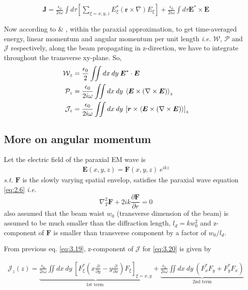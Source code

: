 \documentclass[11pt,a4paper]{article}
\numberwithin{equation}{section}
\begin{document}
\begin{align}
	 \boldsymbol{J}=\frac{\epsilon_0}{2i\omega}\int d\tau \left[\sum_{\xi=x,y,z}E_\xi^\ast(\boldsymbol{r}\times\nabla)E_\xi\right]+ \frac{\epsilon_0}{2i\omega}\int d\tau \boldsymbol{E}^\ast\times \boldsymbol{E}
\end{align}

Now according to \cite{bernatt allen 94} \& \cite{enk nien 92}, within the paraxial approximation, to get time-averaged energy, linear momentum and angular momentum per unit length \textit{i.e.} $\mathcal{W}$, $\mathcal{P}$ and $\mathcal{J}$ respectively, along the beam propagating in z-direction, we have to integrate throughout the transverse xy-plane. So,
\begin{align}
	\mathcal{W}_z&=\frac{\epsilon_0}{2}\iint dx\:dy\: \boldsymbol{E}^\ast\cdot\boldsymbol{E}\label{eq:3.17}\\
	\mathcal{P}_z&=\frac{\epsilon_0}{2i\omega}\iint  dx\:dy\: \expval{\boldsymbol{E}\times (\nabla\times\boldsymbol{E})}_z\\
	\mathcal{J}_z&=\frac{\epsilon_0}{2i\omega}\iint dx\:dy\: \left[\boldsymbol{r}\times\expval{\boldsymbol{E}\times (\nabla\times\boldsymbol{E})}\right]_z
	\label{eq:3.19}
\end{align}


\subsection{More on angular momentum}
Let the electric field of the paraxial EM wave is \cite{WO} 
\begin{align}
	\boldsymbol{E}(x,y,z)=\boldsymbol{F}(x,y,z)\:e^{ikz} \label{eq:3.20}
\end{align}
\textit{s.t.} $\boldsymbol{F}$ is the slowly varying spatial envelop, satisfies the paraxial wave equation \ref{eq:2.6} \textit{i.e.}
$$\nabla_T ^2\boldsymbol{F} +2ik \frac{\partial\boldsymbol{F}}{\partial r}=0$$
also assumed that the beam waist $w_0$ (transverse dimension of the beam) is
assumed to be much smaller than the diffraction length, $l_d = kw_0^2$ and z- component of $\boldsymbol{F}$ is smaller than transverse component by a factor of $w_0/l_d$. \cite{melvin 75}\cite{enk nien 92}\cite{WO}

From previous eq. \ref{eq:3.19}, z-component of $\mathcal{J}$ for \ref{eq:3.20} is given by

\begin{align}
	\mathcal{J}_z (z)
	= \underbrace{\frac{\epsilon_0}{2i\omega} \iint dx\:dy\:\left[F_\xi^\ast\left(x\frac{\partial}{\partial y} - y\frac{\partial}{\partial x}\right)F_\xi\right]_{\xi=x,y}}_{\text{1st term }}
	+\underbrace{\frac{\epsilon_0}{2i\omega}\iint dx\:dy\: (F_x^\ast F_y + F_y^\ast F_x)}_{\text{2nd term}} \label{eq:3.21}
\end{align}
\end{document}
